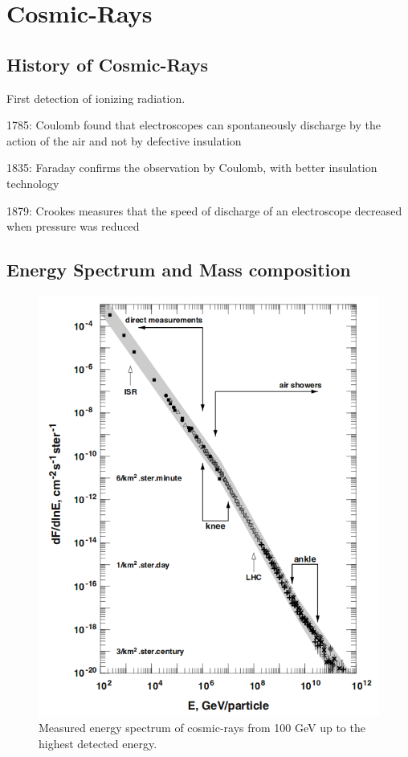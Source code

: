 \chapter{Cosmic-Rays}\label{Ch:Cosmic-rays}

\section{History of Cosmic-Rays}

First detection of ionizing radiation. 

1785: Coulomb found that 
electroscopes can spontaneously 
discharge by the action of the air 
and not by defective insulation

1835: Faraday confirms the 
observation by Coulomb, with 
better insulation technology

1879: Crookes measures that the 
speed of discharge of an 
electroscope decreased when 
pressure was reduced 

\section{Energy Spectrum and Mass composition}

\begin{figure}[hp]
\centering
\includegraphics[width=\textwidth]{chapters/pix/CosmicRay_Spectrum.png}
\caption{Measured energy spectrum of cosmic-rays from 100 GeV up to the highest detected energy.}
\label{fig:CR_Spectrum}
\end{figure}

